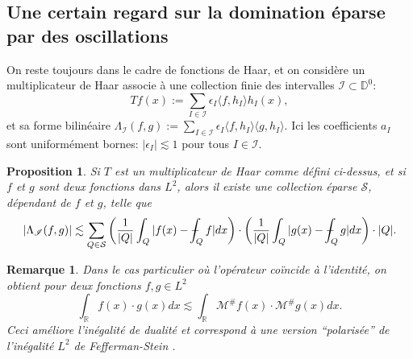 \documentclass[11pt]{amsart}
\newtheorem{proposition}[theorem]{Proposition}
\newtheorem*{remark}{Remarque}
\newcommand{\rr}{\mathbb}
\newcommand{\ii}{\mathscr}
\newcommand{\ic}{\mathcal}
\newcommand{\ds}{\displaystyle}
\newcommand{\Dy}{{\mathbb D}}
\def\Xint#1{\mathchoice
   {\XXint\displaystyle\textstyle{#1}}%
   {\XXint\textstyle\scriptstyle{#1}}%
   {\XXint\scriptstyle\scriptscriptstyle{#1}}%
   {\XXint\scriptscriptstyle\scriptscriptstyle{#1}}%
   \!\int}
\def\XXint#1#2#3{{\setbox0=\hbox{$#1{#2#3}{\int}$}
     \vcenter{\hbox{$#2#3$}}\kern-.5\wd0}}
\def\aver#1{\Xint-_{#1}}
\begin{document}
\subsection{Une certain regard sur la domination \'eparse par des oscillations} \label{sec:oscillation}

On reste toujours dans le cadre de fonctions de Haar, et on consid\`ere un multiplicateur de Haar associe \`a une collection finie des intervalles $\ii I \subset \Dy^0$:
\[
Tf(x):=\sum_{I \in \ii I} \epsilon_I \langle f, h_I \rangle h_I(x), 
\]
et sa forme bilin\'eaire $\ds \Lambda_{\ii I}(f, g):=\sum_{I \in \ii I} \epsilon_I \langle f, h_I \rangle \langle g, h_I \rangle$. Ici les coefficients $a_I$ sont uniform\'ement bornes: $\vert \epsilon_I \vert \lesssim 1$ pour tous $I \in \ii I$.


\begin{proposition}
\label{prop-domination-oscillations}
Si $T$ est un multiplicateur de Haar comme d\'efini ci-dessus, et si $f$ et $g$ sont deux fonctions dans $L^2$, alors il existe une collection \'eparse $\ic S$, d\'ependant de $f$ et $g$, telle que
\[
\vert \Lambda_{\ii I}(f, g) \vert \lesssim \sum_{Q \in \ic S} \left(\frac{1}{\vert Q \vert} \int_Q \vert f(x) -\aver{Q}f  \vert dx\right) \cdot \left(\frac{1}{\vert Q \vert} \int_Q \vert g(x) -\aver{Q}g  \vert dx\right) \cdot \vert Q \vert.
\]
\end{proposition}

\begin{remark}
Dans le cas particulier o\`u l'op\'erateur co\"incide \`a l'identit\'e, on obtient pour deux fonctions $f,g\in L^2$
\[
\int_{\rr R} f(x) \cdot g(x) dx \lesssim \int_{\rr R} \ic M^{\#}f(x) \cdot \ic M^{\#}g(x) dx.
\]
Ceci am\'eliore l'in\'egalit\'e de dualit\'e \cite[(16) page 146]{SteinBigBook} et correspond \`a une version ``polaris\'ee'' de l'in\'egalit\'e $L^2$ de Fefferman-Stein \cite[Corollary 1, page 154]{SteinBigBook}.
\end{remark}
\end{document}
